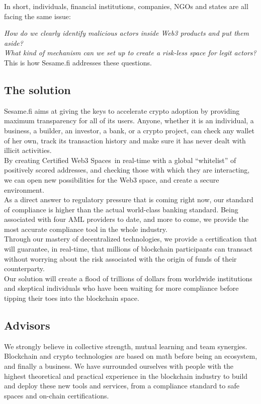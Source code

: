 ﻿\documentclass[a4paper]{article}
\begin{document}
In short, individuals, financial institutions, companies, NGOs and states are all facing the same issue: 

{\it How do we clearly identify malicious actors inside Web3 products and put them aside? \\

What kind of mechanism can we set up to create a risk-less space for legit actors?} \\

This is how Sesame.fi addresses these questions.


\subsection{The solution}
Sesame.fi aims at giving the keys to accelerate crypto adoption by providing maximum transparency for all of its users. Anyone, whether it is an individual, a business, a builder, an investor, a bank, or a crypto project, can check any wallet of her own, track its transaction history and make sure it has never dealt with illicit activities. \\

By creating Certified Web3 Spaces\texttrademark\ in real-time with a global “whitelist” of positively scored addresses, and checking those with which they are interacting, we can open new possibilities for the Web3 space, and create a secure environment. \\

As a direct answer to regulatory pressure that is coming right now, our standard of compliance is higher than the actual world-class banking standard. Being associated with four AML providers to date, and more to come, we provide the most accurate compliance tool in the whole industry. \\

Through our mastery of decentralized technologies, we provide a certification that will guarantee, in real-time, that millions of blockchain participants can transact without worrying about the risk associated with the origin of funds of their counterparty. \\

Our solution will create a flood of trillions of dollars from worldwide institutions and skeptical individuals who have been waiting for more compliance before tipping their toes into the blockchain space.

\subsection{Advisors}
We strongly believe in collective strength, mutual learning and team synergies. Blockchain and crypto technologies are based on math before being an ecosystem, and finally a business. We have surrounded ourselves with people with the highest theoretical and practical experience in the blockchain industry to build and deploy these new tools and services, from a compliance standard to safe spaces and on-chain certifications. \\
\end{document}
